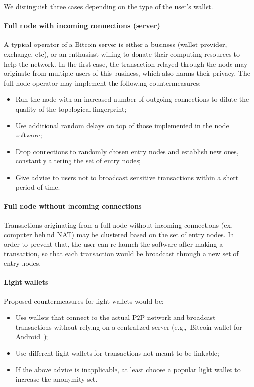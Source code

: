 We distinguish three cases depending on the type of the user's wallet.

\paragraph{Full node with incoming connections (server)}
A typical operator of a Bitcoin server is either a business (wallet provider, exchange, etc), or an enthusiast willing to donate their computing resources to help the network.
In the first case, the transaction relayed through the node may originate from multiple users of this business, which also harms their privacy.
The full node operator may implement the following countermeasures:
\begin{itemize}
	\item Run the node with an increased number of outgoing connections to  dilute the quality of the topological fingerprint;
	\item Use additional random delays on top of those implemented in the node software;
	\item Drop connections to randomly chosen entry nodes and establish new ones, constantly altering the set of entry nodes;
	\item Give advice to users not to broadcast sensitive transactions within a short period of time.
\end{itemize}

\paragraph{Full node without incoming connections}
Transactions originating from a full node without incoming connections (ex. computer behind NAT) may be clustered based on the set of entry nodes.
In order to prevent that, the user can re-launch the software after making a transaction, so that each transaction would be broadcast through a new set of entry nodes.

\paragraph{Light wallets}

Proposed countermeasures for light wallets would be:
\begin{itemize}
	\item Use wallets that connect to the actual P2P network and broadcast transactions without relying on a centralized server (e.g.,~Bitcoin wallet for Android~\cite{BitcoinWallet});
	\item Use different light wallets for transactions not meant to be linkable;
	\item If the above advice is inapplicable, at least choose a popular light wallet to increase the anonymity set.
\end{itemize}

